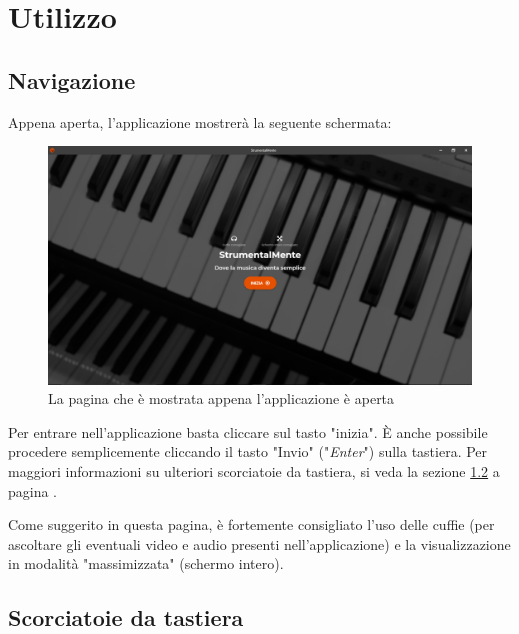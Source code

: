 \chapter{Utilizzo}
\section{Navigazione}
Appena aperta, l'applicazione mostrerà la seguente schermata:
\begin{figure}[H]
	\centering
	\caption[La pagina iniziale]{La pagina che è mostrata appena l'applicazione è aperta}
	\label{fig:landing-page}
	\includegraphics[width=\textwidth]{images/landing-page}
\end{figure}
Per entrare nell'applicazione basta cliccare sul tasto "inizia". È anche
possibile procedere semplicemente cliccando il tasto "Invio" ("\textit{Enter}")
sulla tastiera. Per maggiori informazioni su ulteriori scorciatoie da tastiera,
si veda la sezione \ref{sec:shortcuts} a pagina \pageref{sec:shortcuts}.
\begin{leftbar}
	\faWarning{} Come suggerito in questa pagina, è fortemente consigliato l'uso
	delle cuffie (per ascoltare gli eventuali video e audio presenti
	nell'applicazione) e la visualizzazione in modalità "massimizzata" (schermo
	intero).
\end{leftbar}
\section{Scorciatoie da tastiera}\label{sec:shortcuts}